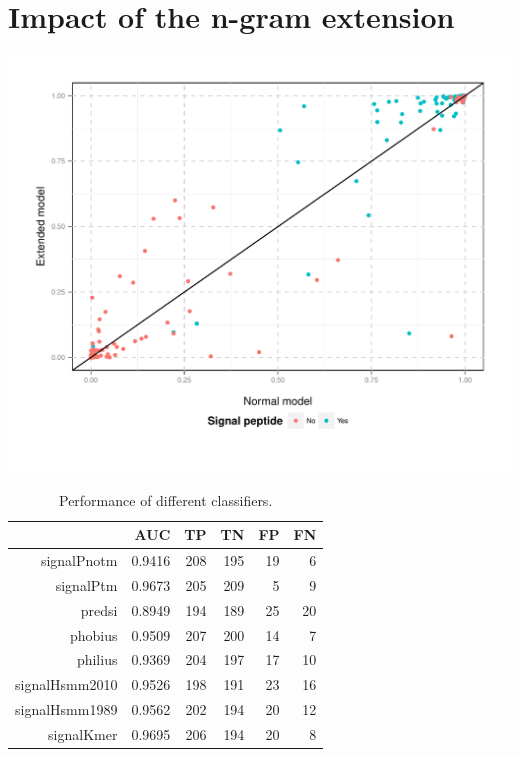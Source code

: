 \documentclass[10pt]{beamer}\usepackage[]{graphicx}\usepackage[]{color}
\makeatletter
\def\maxwidth{ %
  \ifdim\Gin@nat@width>\linewidth
    \linewidth
  \else
    \Gin@nat@width
  \fi
}
\makeatother
\begin{document}

\section{Impact of the n-gram extension}

\begin{frame}

\includegraphics[width=\maxwidth]{figure/unnamed-chunk-2-1} 

\end{frame}

\begin{frame}
\begin{table}[ht]
\centering
\caption{Performance of different classifiers.} 
\begin{tabular}{rrrrrr}
  \toprule
 & AUC & TP & TN & FP & FN \\ 
  \midrule
signalPnotm & 0.9416 &   208 &   195 &    19 &     6 \\ 
   \rowcolor[gray]{0.85}signalPtm & 0.9673 &   205 &   209 &     5 &     9 \\ 
  predsi & 0.8949 &   194 &   189 &    25 &    20 \\ 
   \rowcolor[gray]{0.85}phobius & 0.9509 &   207 &   200 &    14 &     7 \\ 
  philius & 0.9369 &   204 &   197 &    17 &    10 \\ 
   \rowcolor[gray]{0.85}signalHsmm2010 & 0.9526 &   198 &   191 &    23 &    16 \\ 
  signalHsmm1989 & 0.9562 &   202 &   194 &    20 &    12 \\ 
   \rowcolor[gray]{0.85}signalKmer & 0.9695 &   206 &   194 &    20 &     8 \\ 
   \bottomrule
\end{tabular}
\end{table}

\end{frame}
\end{document}
